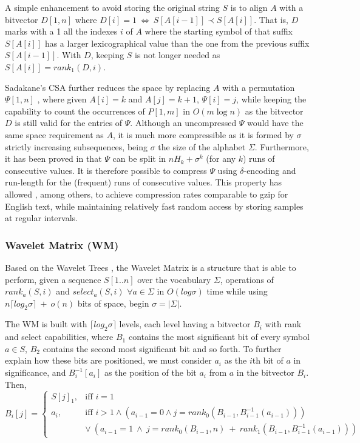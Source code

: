 \documentclass[runningheads]{llncs}
\begin{document}
A simple enhancement to avoid storing the original string $S$ is to align $A$ with a bitvector $D[1,n]$ where $D[i]=1~\Leftrightarrow~S[A[i-1]] \prec S[A[i]]$. That is, $D$ marks with a 1 all the indexes $i$ of $A$ where the starting symbol of that suffix $S[A[i]]$ has a larger lexicographical value than the one from the previous suffix $S[A[i-1]]$. With $D$, keeping $S$ is not longer needed as $S[A[i]] = rank_1(D,i)$.

Sadakane's CSA \cite{Sad03} further reduces the space by replacing $A$ with a permutation $\Psi[1,n]$ \cite{GV00}, where given $A[i]=k$ and $A[j]=k+1$, $\Psi[i]=j$, while keeping the capability to count the occurrences of $P[1,m]$ in $O(m \log n)$ as the bitvector $D$ is still valid for the entries of $\Psi$. Although an uncompressed $\Psi$ would have the same space requirement as $A$, it is much more compressible as it is formed by $\sigma$ strictly increasing subsequences, being $\sigma$ the size of the alphabet $\Sigma$. Furthermore, it has been proved in \cite{NM07} that $\Psi$ can be split in $nH_k+\sigma^k$ (for any $k$) runs of consecutive values. It is therefore possible to compress $\Psi$ using $\delta$-encoding and run-length for the (frequent) runs of consecutive values. This property has allowed \cite{FBNCPR12}, among others, to achieve compression rates comparable to gzip for English text, while maintaining relatively fast random access by storing samples at regular intervals.

\subsubsection{Wavelet Matrix (WM)}
\label{sec:wm}
Based on the Wavelet Trees \cite{WT03}, the Wavelet Matrix \cite{CNO15} is a structure that is able to perform, given a sequence $S[1..n]$ over the vocabulary $\Sigma$, operations of $rank_a(S,i)$ and $select_a(S,i)$ $\forall a \in \Sigma$ in $O(log\sigma)$ time while using $n\lceil log_2\sigma\rceil~+~o(n)$ bits of space, begin $\sigma = |\Sigma|$.

The WM is built with $\lceil log_2\sigma\rceil$ levels, each level having a bitvector $B_i$ with rank and select capabilities, where $B_1$ contains the most significant bit of every symbol $a \in S$, $B_2$ contains the second most significant bit and so forth. To further explain how these bits are positioned, we must consider $a_i$ as the $i$th bit of $a$ in significance, and $B^{-1}_i[a_i]$ as the position of the bit $a_i$ from $a$ in the bitvector $B_i$. Then, 
\[
    B_i[j] = \left\{\begin{array}{lr}
        S[j]_1, & \text{iff } i=1\\
        a_i, & \text{iff } i>1 \wedge (a_{i-1}=0 \wedge j=rank_0(B_{i-1},B^{-1}_{i-1}(a_{i-1}))) \\
        & \vee~(a_{i-1}=1~\wedge~j=rank_0(B_{i-1},n)~+~rank_1(B_{i-1},B^{-1}_{i-1}(a_{i-1})))
        \end{array}\right.
\]
\end{document}
